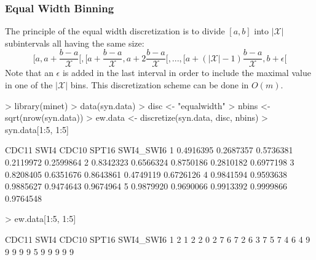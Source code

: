 \documentclass{article}
\begin{document}
\subsubsection{Equal Width Binning}
The principle of the equal width discretization is to divide $[a, b]$ into $|\mathcal{X}|$ 
subintervals all having the same size: 
$$ [a, a + \frac{b-a}{\mathcal{X}} [, [a + \frac{b-a}{\mathcal{X}} , a + 2 \frac{b-a}{\mathcal{X}} [, ... , [a + (|\mathcal{X} |-1)\frac{b-a}{\mathcal{X}},b + \epsilon[ $$ 
Note that an $\epsilon$ is added in the last interval in order to include the maximal value in one of the 
$|\mathcal{X}|$ bins. This discretization scheme can be done in $O(m)$.
\begin{Schunk}
\begin{Sinput}
> library(minet)
> data(syn.data)
> disc <- "equalwidth"
> nbins <- sqrt(nrow(syn.data))
> ew.data <- discretize(syn.data, disc, nbins)
> syn.data[1:5, 1:5]
\end{Sinput}
\begin{Soutput}
      CDC11      SWI4     CDC10     SPT16 SWI4_SWI6
1 0.4916395 0.2687357 0.5736381 0.2119972 0.2599864
2 0.8342323 0.6566324 0.8750186 0.2810182 0.6977198
3 0.8208405 0.6351676 0.8643861 0.4749119 0.6726126
4 0.9841594 0.9593638 0.9885627 0.9474643 0.9674964
5 0.9879920 0.9690066 0.9913392 0.9999866 0.9764548
\end{Soutput}
\begin{Sinput}
> ew.data[1:5, 1:5]
\end{Sinput}
\begin{Soutput}
  CDC11 SWI4 CDC10 SPT16 SWI4_SWI6
1     2    1     2     2         0
2     7    6     7     2         6
3     7    5     7     4         6
4     9    9     9     9         9
5     9    9     9     9         9
\end{Soutput}
\end{Schunk}
\end{document}
